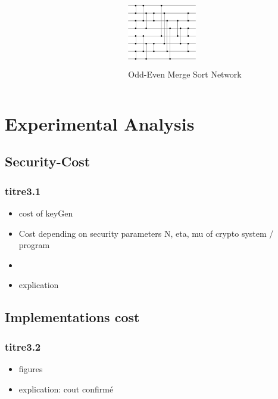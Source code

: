 \documentclass{beamer}
\begin{document}
\begin{frame}
\begin{columns}
\begin{column}[c]{3cm}
\begin{figure}
\end{figure}
\end{column}
\begin{column}[c]{3cm}
\begin{figure}
\vspace{-5ex}
\centering
\includegraphics[width=3cm, height=3cm]{networkOdddEven.png} 
\caption{Odd-Even Merge Sort Network } 
\end{figure}
\end{column}
\end{columns}

\end{frame}



\section[Experimental Analysis]{Experimental Analysis}

\subsection{Security-Cost}

\begin{frame} \frametitle{titre3.1}
  \begin{itemize}
  \item cost of keyGen
  \item Cost depending on security parameters N, eta, mu of crypto system / program
  \item {}
  \item explication
  \end{itemize}
\end{frame}

\subsection{Implementations cost}

\begin{frame} \frametitle{titre3.2}
  \begin{itemize}
  \item figures
  \item explication: cout confirmé
  \end{itemize}
\end{frame}
\end{document}

